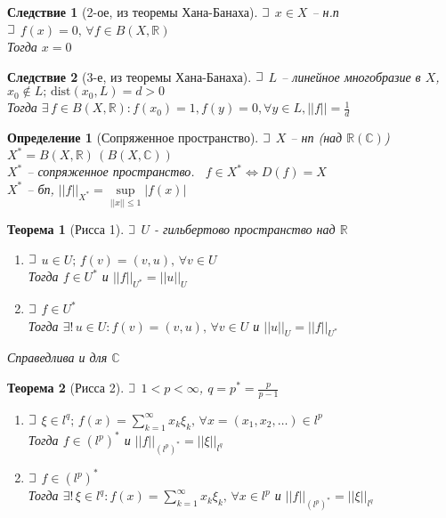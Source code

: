 \documentclass{article}
\theoremstyle{truestyle}
\newtheorem*{defenition}{Определение}
\newtheorem*{theorem}{Теорема}
\newtheorem*{sled}{Следствие}
\newcommand{\dist}{\text{dist}}
\def\letus{%
	\mathord{\setbox0=\hbox{$\exists$}%
		\hbox{\kern 0.125\wd0%
			\vbox to \ht0{%
				\hrule width 0.75\wd0%
				\vfill%
				\hrule width 0.75\wd0}%
			\vrule height \ht0%
			\kern 0.125\wd0}%
	}%
}
\begin{document}
\begin{sled}[2-ое, из теоремы Хана-Банаха]
  $\letus$ $x \in X$ -- н.п \\
  $\letus$ $f(x) = 0, \, \forall f \in B(X, \mathbb{R})$ \\
  Тогда $x = 0$
\end{sled}

\begin{sled}[3-е, из теоремы Хана-Банаха]
  $\letus$ $L$ -- линейное многобразие в $X$, $x_0 \not \in L; \, \dist(x_0, L) = d >0$\\ 
  Тогда $\exists \, f \in B(X, \mathbb{R}): f(x_0) = 1, f(y) = 0, \forall y \in L, ||f|| = \frac{1}{d}$
\end{sled}
  
\begin{defenition}[Сопряженное пространство]
  $\letus$ $X$ -- нп  (над  $\mathbb{R}(\mathbb{C})$) \
  $X^* = B(X, \mathbb{R}) \, (B(X, \mathbb{C}))$ \\
  $X^*$ -- сопряженное пространство. \ $f \in X^* \Longleftrightarrow D(f) = X$\\
  $X^*$ -- бп, $||f||_{X^*} = \sup\limits_{||x|| \le 1} |f(x)|$
\end{defenition}

\begin{theorem}[Рисса 1]
  $\letus$ $U$ - гильбертово пространство над $\mathbb{R}$
  \begin{enumerate}
    \item $\letus$ $u \in U; \, f(v) = (v, u), \, \forall v \in U$\\
    Тогда $f \in U^*$ и $||f||_{U^*} = ||u||_U$
    \item $\letus$ $f \in U^*$\\
    Тогда $\exists! \, u\in U: f(v) = (v, u), \, \forall v \in U$ и $||u||_U = ||f||_{U^*}$
    \end{enumerate}
    Справедлива и для $\mathbb{C}$
\end{theorem}

\begin{theorem}[Рисса 2]
  $\letus$ $1 < p < \infty$, $q = p^* = \frac{p}{p-1}$
  \begin{enumerate}
    \item $\letus$ $\xi \in l^q; \, f(x) = \sum\limits_{k=1}^{\infty} x_k \xi_k, \, \forall x = (x_1, x_2, \dots) \in l^p$\\
    Тогда $f \in (l^p)^*$ и $||f||_{(l^p)^*} = ||\xi||_{l^q}$
    \item $\letus$ $f \in (l^p)^*$\\
    Тогда $\exists! \, \xi \in l^q: f(x) = \sum\limits_{k=1}^{\infty} x_k \xi_k, \, \forall x \in l^p$ 
    и $||f||_{(l^p)^*} = ||\xi||_{l^q}$
    \end{enumerate}
\end{theorem}
\end{document}
